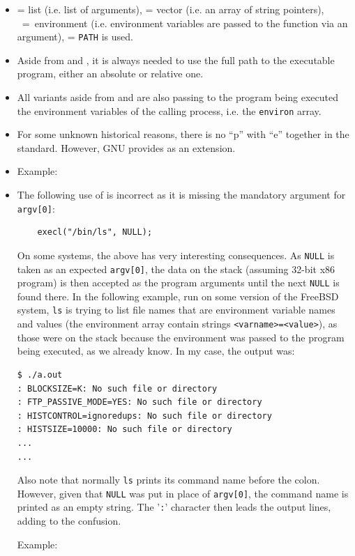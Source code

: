 \begin{itemize}
\item {} = list (i.e. list of arguments),  = vector (i.e.  an array
of string pointers), ~=~environment (i.e. environment variables are
passed to the function via an argument),  = \texttt{PATH} is used.
\item Aside from  and , it is always needed to use
the full path to the executable program, either an absolute or relative one.
\item All variants aside from  and 
are also passing to the program being executed the environment variables of the
calling process, i.e. the \texttt{environ} array.
\item For some unknown historical reasons, there is no ``p'' with ``e'' together
in the standard.  However, GNU provides  as an extension.
\item {} Example: 
\item {} The following use of  is incorrect as it is
missing the mandatory argument for \texttt{argv[0]}:

\begin{verbatim}
	execl("/bin/ls", NULL);
\end{verbatim}

On some systems, the above has very interesting consequences.  As \texttt{NULL}
is taken as an expected \texttt{argv[0]}, the data on the stack (assuming 32-bit
x86 program) is then accepted as the program arguments until the next
\texttt{NULL} is found there.
In the following example, run on some version of the FreeBSD system, \texttt{ls}
is trying to list file names that are environment variable names and values (the
environment array contain strings \texttt{<varname>=<value>}), as those were on
the stack because the environment was passed to the program being executed, as
we already know.  In my case, the output was:

\begin{verbatim}
$ ./a.out
: BLOCKSIZE=K: No such file or directory
: FTP_PASSIVE_MODE=YES: No such file or directory
: HISTCONTROL=ignoredups: No such file or directory
: HISTSIZE=10000: No such file or directory
...
...
\end{verbatim}

Also note that normally \texttt{ls} prints its command name before the colon.
However, given that \texttt{NULL} was put in place of \texttt{argv[0]}, the
command name is printed as an empty string.  The '\texttt{:}' character then
leads the output lines, adding to the confusion.

Example: 
\end{itemize}

